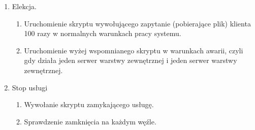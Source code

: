 \begin{enumerate}
\begin{enumerate}[label*=\arabic*.]
	\end{enumerate}
	\item Elekcja.
	\begin{enumerate}[label*=\arabic*.]
		\item Uruchomienie skryptu wywołującego zapytanie (pobierające plik)  klienta 100 razy w normalnych warunkach pracy systemu.
		\item Uruchomienie wyżej wspomnianego skryptu w warunkach awarii, czyli gdy działa jeden serwer warstwy zewnętrznej i jeden serwer warstwy zewnętrznej.   
	\end{enumerate}
	\item Stop usługi
	\begin{enumerate}[label*=\arabic*.]
		\item Wywołanie skryptu zamykającego usługę.
		\item Sprawdzenie zamknięcia na każdym węźle.  
	\end{enumerate}
\end{enumerate}
